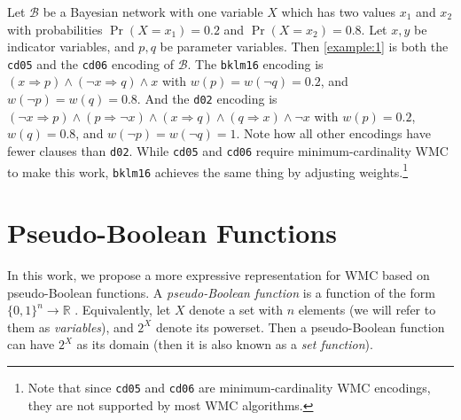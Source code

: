 \begin{example} \label{example:2}
  Let $\mathcal{B}$ be a Bayesian network with one variable $X$ which has two
  values $x_1$ and $x_2$ with probabilities $\Pr(X = x_1) = 0.2$ and $\Pr(X =
  x_2) = 0.8$. Let $x, y$ be indicator variables, and $p, q$ be parameter
  variables. Then \cref{example:1} is both the \texttt{cd05} and the
  \texttt{cd06} encoding of $\mathcal{B}$. The \texttt{bklm16} encoding is $(x
  \Rightarrow p) \land (\neg x \Rightarrow q) \land x$ with $w(p) = w(\neg q) =
  0.2$, and $w(\neg p) = w(q) = 0.8$. And the \texttt{d02} encoding is $(\neg x
  \Rightarrow p) \land (p \Rightarrow \neg x) \land (x \Rightarrow q) \land (q
  \Rightarrow x) \land \neg x$ with $w(p) = 0.2$, $w(q) = 0.8$, and $w(\neg p) =
  w(\neg q) = 1$. Note how all other encodings have fewer clauses than
  \texttt{d02}. While \texttt{cd05} and \texttt{cd06} require
  minimum-cardinality WMC to make this work, \texttt{bklm16} achieves the same
  thing by adjusting weights.\footnote{Note that since \texttt{cd05} and
    \texttt{cd06} are minimum-cardinality WMC encodings, they are not supported
    by most WMC algorithms.}
\end{example}


\section{Pseudo-Boolean Functions}

In this work, we propose a more expressive representation for WMC based on
pseudo-Boolean functions. A \emph{pseudo-Boolean function} is a function of the
form $\{ 0, 1 \}^n \to \mathbb{R}$ \citep{DBLP:journals/dam/BorosH02}.
Equivalently, let $X$ denote a set with $n$ elements (we will refer to them as
\emph{variables}), and $2^X$ denote its powerset. Then a pseudo-Boolean function
can have $2^X$ as its domain (then it is also known as a \emph{set function}).

